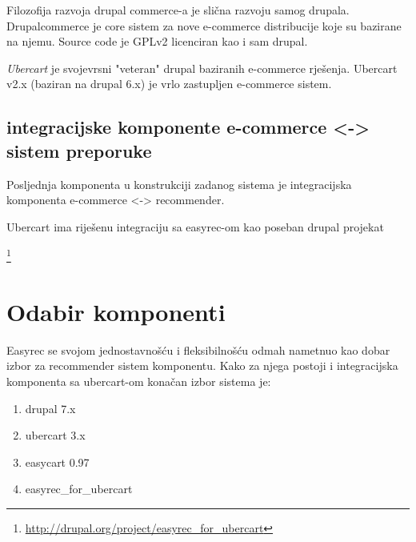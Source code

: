 \documentclass[times, utf8, seminar]{fit}
\begin{document}
{Filozofija razvoja drupal commerce-a je slična razvoju samog drupala. Drupalcommerce je core sistem za nove e-commerce distribucije koje su bazirane na njemu.
Source code je GPLv2 licenciran kao i sam drupal.

\emph{Ubercart} je svojevrsni "veteran" drupal baziranih e-commerce rješenja. Ubercart v2.x (baziran na drupal 6.x) je vrlo zastupljen e-commerce sistem.

\subsection{integracijske komponente e-commerce <-> sistem preporuke}

Posljednja komponenta u konstrukciji zadanog sistema je integracijska komponenta e-commerce <-> recommender.

Ubercart ima riješenu integraciju sa easyrec-om kao poseban drupal projekat{\footnote{\url{http://drupal.org/project/easyrec\_for\_ubercart}} 

\section{Odabir komponenti}

Easyrec se svojom jednostavnošću i fleksibilnošću odmah nametnuo kao dobar izbor za recommender sistem komponentu. 
Kako za njega postoji i integracijska komponenta sa ubercart-om konačan izbor sistema je:
\begin{enumerate}
  \item drupal 7.x
  \item ubercart 3.x
  \item easycart 0.97
  \item easyrec\_for\_ubercart
\end{enumerate}



}}
\end{document}
